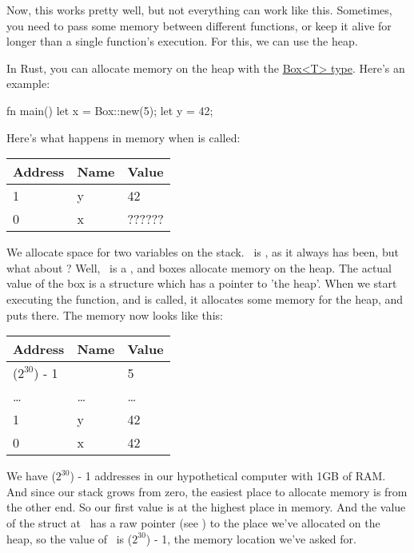 Now, this works pretty well, but not everything can work like this. Sometimes, you need to pass some memory between different 
functions, or keep it alive for longer than a single function's execution. For this, we can use the heap.

\blank

In Rust, you can allocate memory on the heap with the \href{https://doc.rust-lang.org/std/boxed/}{Box<T> type}. Here's an example:

\begin{rustc}
fn main() {
    let x = Box::new(5);
    let y = 42;
}
\end{rustc}

Here's what happens in memory when  is called:

\begin{table}[H]
  \begin{tabular}{|l|l|l|}
    \hline
    \textbf{Address} & \textbf{Name} & \textbf{Value} \\
    \hline
    1 & y & 42 \\
    \hline
    0 & x & ?????? \\
    \hline
  \end{tabular}
\end{table}

We allocate space for two variables on the stack. \y\ is , as it always has been, but what about \x? Well, \x\ is a 
, and boxes allocate memory on the heap. The actual value of the box is a structure which has a pointer to 'the heap'. 
When we start executing the function, and  is called, it allocates some memory for the heap, and puts  there. 
The memory now looks like this:

\begin{table}[H]
  \begin{tabular}{|l|l|l|}
    \hline
    \textbf{Address} & \textbf{Name} & \textbf{Value} \\
    \hline
    ($2^{30}$) - 1 & & 5 \\
    \hline
    \ldots & \ldots & \ldots \\
    \hline
    1 & y & 42 \\
    \hline
    0 & x & 42 \\
    \hline
  \end{tabular}
\end{table}

We have ($2^{30}$) - 1 addresses in our hypothetical computer with 1GB of RAM. And since our stack grows from zero, the easiest place 
to allocate memory is from the other end. So our first value is at the highest place in memory. And the value of the struct at \x\ has a 
raw pointer (see ) to the place we've allocated on the heap, so the value of \x\ is ($2^{30}$) - 1, the 
memory location we've asked for.

